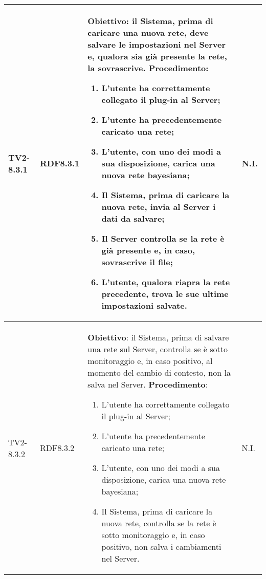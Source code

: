 \begin{longtable}{|C{.15\textwidth}|C{.13\textwidth}|m{.65\textwidth}|C{.08\textwidth}|}
TV2-8.3.1 & RDF8.3.1 &
	\textbf{Obiettivo}: il Sistema, prima di caricare una nuova rete, deve salvare le impostazioni nel Server e, qualora sia già presente la rete, la sovrascrive. \newline
	\textbf{Procedimento}:
	\begin{enumerate}
		\item L'utente ha correttamente collegato il plug-in al Server;
		\item L'utente ha precedentemente caricato una rete;
		\item L'utente, con uno dei modi a sua disposizione, carica una nuova rete bayesiana;
		\item Il Sistema, prima di caricare la nuova rete, invia al Server i dati da salvare;
		\item Il Server controlla se la rete è già presente e, in caso, sovrascrive il file;
		\item L'utente, qualora riapra la rete precedente, trova le sue ultime impostazioni salvate.
	\end{enumerate}
	& N.I. \\
\hline	

TV2-8.3.2 & RDF8.3.2 &
	\textbf{Obiettivo}: il Sistema, prima di salvare una rete sul Server, controlla se è sotto monitoraggio e, in caso positivo, al momento del cambio di contesto, non la salva nel Server. \newline
	\textbf{Procedimento}:
	\begin{enumerate}
		\item L'utente ha correttamente collegato il plug-in al Server;
		\item L'utente ha precedentemente caricato una rete;
		\item L'utente, con uno dei modi a sua disposizione, carica una nuova rete bayesiana;
		\item Il Sistema, prima di caricare la nuova rete, controlla se la rete è sotto monitoraggio e, in caso positivo, non salva i cambiamenti nel Server.
	\end{enumerate}
	& N.I. \\
\hline	


\end{longtable}

